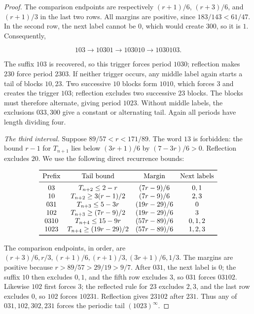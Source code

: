 \documentclass[11pt,a4paper]{amsart}
\numberwithin{equation}{section}
\theoremstyle{definition}
\begin{document}
\begin{proof}
The comparison endpoints are respectively \((r+1)/6\),
\((r+3)/6\), and \((r+1)/3\) in the last two rows.
All margins are positive, since \(183/143<61/47\).
In the second row, the next label cannot be \(0\), which would
create \(300\), so it is \(1\). Consequently,

\[
103\longrightarrow10301\longrightarrow103010
\longrightarrow1030103.
\]

The suffix \(103\) is recovered, so this trigger forces period
\(1030\); reflection makes \(230\) force period \(2303\).
If neither trigger occurs, any middle label again starts a tail
of blocks \(10,23\). Two successive \(10\) blocks form \(1010\),
which forces \(3\) and creates the trigger \(103\); reflection
excludes two successive \(23\) blocks. The blocks must therefore
alternate, giving period \(1023\). Without middle labels, the
exclusions \(033,300\) give a constant or alternating tail.
Again all periods have length dividing four.

\emph{The third interval.}
Suppose \(89/57<r<171/89\). The word \(13\) is forbidden:
the bound \(r-1\) for \(T_{n+1}\) lies below \((3r+1)/6\)
by \((7-3r)/6>0\). Reflection excludes \(20\).
We use the following direct recurrence bounds:

\[
\begin{array}{c@{\quad}c@{\quad}c@{\quad}c}
\toprule
\text{Prefix} & \text{Tail bound} & \text{Margin} & \text{Next labels}\\
\midrule
03 & T_{n+2}\le2-r & (7r-9)/6 & 0,1\\
10 & T_{n+2}\ge3(r-1)/2 & (7r-9)/6 & 2,3\\
031 & T_{n+3}\le5-3r & (19r-29)/6 & 0\\
102 & T_{n+3}\ge(7r-9)/2 & (19r-29)/6 & 3\\
0310 & T_{n+4}\le15-9r & (57r-89)/6 & 0,1,2\\
1023 & T_{n+4}\ge(19r-29)/2 & (57r-89)/6 & 1,2,3\\
\bottomrule
\end{array}
\]

The comparison endpoints, in order, are
\((r+3)/6,r/3,(r+1)/6,(r+1)/3,(3r+1)/6,1/3\).
The margins are positive because \(r>89/57>29/19>9/7\).
After \(031\), the next label is \(0\); the suffix \(10\)
then excludes \(0,1\), and the fifth row excludes \(3\), so
\(031\) forces \(03102\). Likewise \(102\) first forces \(3\);
the reflected rule for \(23\) excludes \(2,3\), and the last
row excludes \(0\), so \(102\) forces \(10231\). Reflection
gives \(23102\) after \(231\). Thus any of \(031,102,302,231\)
forces the periodic tail \((1023)^\infty\).


\end{proof}
\end{document}
